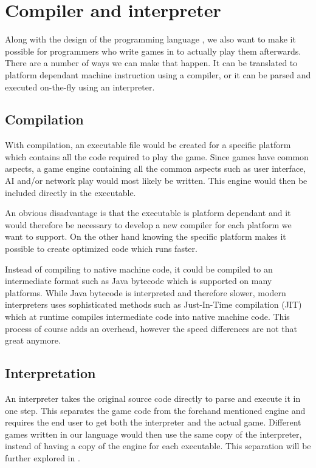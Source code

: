 \section{Compiler and interpreter}
Along with the design of the programming language \productname{}, we also want to make it possible for programmers who write games in \productname{} to actually play them afterwards. 
There are a number of ways we can make that happen. It can be translated to platform dependant machine instruction using a compiler, or it can be parsed and executed on-the-fly using an interpreter.

\subsection{Compilation}
With compilation, an executable file would be created for a specific platform which contains all the code required to play the game. 
Since games have common aspects, a game engine containing all the common aspects such as user interface, AI and/or network play would most likely be written. 
This engine would then be included directly in the executable.

An obvious disadvantage is that the executable is platform dependant and it would therefore be necessary to develop a new compiler for each platform we want to support. 
On the other hand knowing the specific platform makes it possible to create optimized code which runs faster.

Instead of compiling to native machine code, it could be compiled to an intermediate format such as Java bytecode which is supported on many platforms.
While Java bytecode is interpreted and therefore slower, modern interpreters uses sophisticated methods such as Just-In-Time compilation (JIT) which at runtime compiles intermediate code into native machine code. 
This process of course adds an overhead, however the speed differences are not that great anymore\cite{java-speed}.

\subsection{Interpretation}
An interpreter takes the original source code directly to parse and execute it in one step.
This separates the game code from the forehand mentioned engine and requires the end user to get both the interpreter and the actual game.
Different games written in our language would then use the same copy of the interpreter, instead of having a copy of the engine for each executable. This separation will be further explored in .

